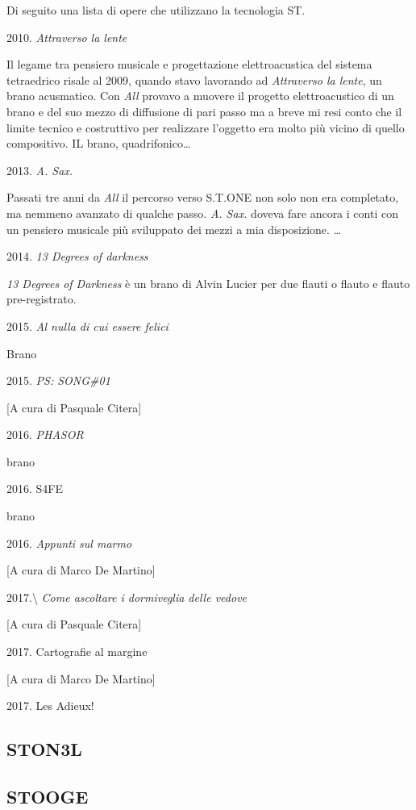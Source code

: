 \documentclass[a4paper,11pt]{article}
\begin{document}
Di seguito una lista di opere che utilizzano la tecnologia ST.

2010. \emph{Attraverso la lente}

Il legame tra pensiero musicale e progettazione elettroacustica del
sistema tetraedrico risale al 2009, quando stavo lavorando ad
\emph{Attraverso la lente}, un brano acusmatico. Con \emph{All} provavo a muovere
il progetto elettroacustico di un brano e del suo mezzo di diffusione di
pari passo ma a breve mi resi conto che il limite tecnico e costruttivo
per realizzare l'oggetto era molto più vicino di quello compositivo. IL
brano, quadrifonico\ldots{} 

2013. \emph{A. Sax.}

Passati tre anni da \emph{All} il percorso verso S.T.ONE non solo non era
completato, ma nemmeno avanzato di qualche passo. \emph{A. Sax.} doveva fare
ancora i conti con un pensiero musicale più sviluppato dei mezzi a mia
disposizione. \ldots{} 

2014. \emph{13 Degrees of darkness}

\emph{13 Degrees of Darkness} è un brano di Alvin Lucier per due flauti o
flauto e flauto pre-registrato.

2015. \emph{Al nulla di cui essere felici}

Brano

2015. \emph{PS: SONG\#01}

{[}A cura di Pasquale Citera{]}

2016. \emph{PHASOR}

brano

2016. S4FE

brano

2016. \emph{Appunti sul marmo}

{[}A cura di Marco De Martino{]}

2017.\textbackslash{}
\emph{Come ascoltare i dormiveglia delle vedove}

{[}A cura di Pasquale Citera{]}

2017. Cartografie al margine

{[}A cura di Marco De Martino{]}

2017. Les Adieux!

\subsection{STON3L}\hypertarget{ston3l}{}\label{ston3l}

\subsection{STOOGE}\hypertarget{stooge}{}\label{stooge}
\end{document}
